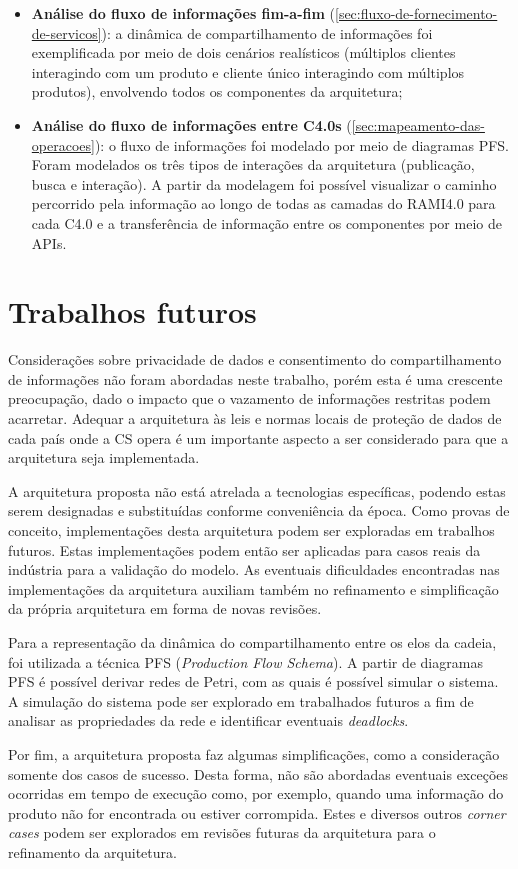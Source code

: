 \begin{itemize}
  \item \textbf{Análise do fluxo de informações fim-a-fim} (\autoref{sec:fluxo-de-fornecimento-de-servicos}): a dinâmica de compartilhamento de informações foi exemplificada por meio de dois cenários realísticos (múltiplos clientes interagindo com um produto e cliente único interagindo com múltiplos produtos), envolvendo todos os componentes da arquitetura;
  \item \textbf{Análise do fluxo de informações entre C4.0s} (\autoref{sec:mapeamento-das-operacoes}): o fluxo de informações foi modelado por meio de diagramas PFS. Foram modelados os três tipos de interações da arquitetura (publicação, busca e interação). A partir da modelagem foi possível visualizar o caminho percorrido pela informação ao longo de todas as camadas do RAMI4.0 para cada C4.0 e a transferência de informação entre os componentes por meio de APIs.
\end{itemize}

\section{Trabalhos futuros}

Considerações sobre privacidade de dados e consentimento do compartilhamento de informações não foram abordadas neste trabalho, porém esta é uma crescente preocupação, dado o impacto que o vazamento de informações restritas podem acarretar. Adequar a arquitetura às leis e normas locais de proteção de dados de cada país onde a CS opera é um importante aspecto a ser considerado para que a arquitetura seja implementada.

A arquitetura proposta não está atrelada a tecnologias específicas, podendo estas serem designadas e substituídas conforme conveniência da época. Como provas de conceito, implementações desta arquitetura podem ser exploradas em trabalhos futuros. Estas implementações podem então ser aplicadas para casos reais da indústria para a validação do modelo. As eventuais dificuldades encontradas nas implementações da arquitetura auxiliam também no refinamento e simplificação da própria arquitetura em forma de novas revisões.

Para a representação da dinâmica do compartilhamento entre os elos da cadeia, foi utilizada a técnica PFS (\textit{Production Flow Schema}). A partir de diagramas PFS é possível derivar redes de Petri, com as quais é possível simular o sistema. A simulação do sistema pode ser explorado em trabalhados futuros a fim de analisar as propriedades da rede e identificar eventuais \textit{deadlocks}.

Por fim, a arquitetura proposta faz algumas simplificações, como a consideração somente dos casos de sucesso. Desta forma, não são abordadas eventuais exceções ocorridas em tempo de execução como, por exemplo, quando uma informação do produto não for encontrada ou estiver corrompida. Estes e diversos outros \textit{corner cases} podem ser explorados em revisões futuras da arquitetura para o refinamento da arquitetura.

